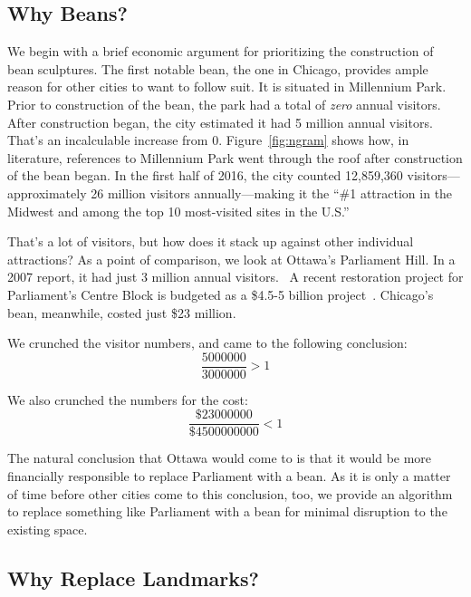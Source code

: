 \documentclass[%
reprint,
twocolumn,
nofootinbib,
 amsmath,amssymb,
 aps,
]{revtex4-2}
\begin{document}
\subsection{Why Beans?}

We begin with a brief economic argument for prioritizing the construction of bean sculptures. The first notable bean, the one in Chicago, provides ample reason for other cities to want to follow suit. It is situated in Millennium Park. Prior to construction of the bean, the park had a total of \emph{zero} annual visitors. After construction began, the city estimated it had 5 million annual visitors.~\cite{chicagoMayorEmanuel} That's an incalculable increase from 0. Figure~\ref{fig:ngram} shows how, in literature, references to Millennium Park went through the roof after construction of the bean began. In the first half of 2016, the city counted 12,859,360 visitors---approximately 26 million visitors annually---making it the ``\#1 attraction in the Midwest and among the top 10 most-visited sites in the U.S.''~\cite{chicagoMayorEmanuel}

That's a lot of visitors, but how does it stack up against other individual attractions? As a point of comparison, we look at Ottawa's Parliament Hill. In a 2007 report, it had just 3 million annual visitors.~\cite{ctvnewsParliamentHill} A recent restoration project for Parliament's Centre Block is budgeted as a \$4.5-5 billion project~\cite{canadaQuarterlyProgress}. Chicago's bean, meanwhile, costed just \$23 million.~\cite{theclareChicagoHistory}

We crunched the visitor numbers, and came to the following conclusion:
\begin{equation}
    \frac{\num[group-separator={,}]{5000000}}{\num[group-separator={,}]{3000000}} > 1
\end{equation}

We also crunched the numbers for the cost:
\begin{equation}
    \frac{\$\num[group-separator={,}]{23000000}}{\$\num[group-separator={,}]{4500000000}} < 1
\end{equation}

The natural conclusion that Ottawa would come to is that it would be more financially responsible to replace Parliament with a bean. As it is only a matter of time before other cities come to this conclusion, too, we provide an algorithm to replace something like Parliament with a bean for minimal disruption to the existing space.

\subsection{Why Replace Landmarks?}
\end{document}

